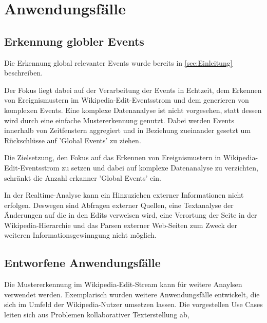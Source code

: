 \section{Anwendungsfälle}
\subsection{Erkennung globler Events}
Die Erkennung global relevanter Events wurde bereits in \ref{sec:Einleitung} beschreiben.

Der Fokus liegt dabei auf der Verarbeitung der Events in Echtzeit, dem Erkennen von Ereignismustern im Wikipedia-Edit-Eventsstrom und dem generieren von komplexen Events. Eine komplexe Datenanalyse ist nicht vorgesehen, statt dessen wird durch eine einfache Mustererkennung genutzt. Dabei werden Events innerhalb von Zeitfenstern aggregiert und in Beziehung zueinander gesetzt um Rückschlüsse auf 'Global Events' zu ziehen.

Die Zielsetzung, den Fokus auf das Erkennen von Ereignismustern in Wikipedia-Edit-Eventsstrom zu setzen und dabei auf komplexe Datenanalyse zu verzichten, schränkt die Anzahl erkanner 'Global Events' ein.

In der Realtime-Analyse kann ein Hinzuziehen externer Informationen nicht erfolgen. Deswegen sind Abfragen externer Quellen, eine Textanalyse der Änderungen auf die in den Edits verweisen wird, eine Verortung der Seite in der Wikipedia-Hierarchie und das Parsen externer Web-Seiten zum Zweck der weiteren Informationsgewinngung nicht möglich. 



\subsection{Entworfene Anwendungsfälle}
Die Mustererkennung im Wikipedia-Edit-Stream kann für weitere Anaylsen verwendet werden. Exemplarisch wurden weitere Anwendungsfälle entwickelt, die sich im Umfeld der Wikipedia-Nutzer umsetzen lassen. Die vorgestellen Use Cases leiten sich aus Problemen kollaborativer Texterstellung ab, 

